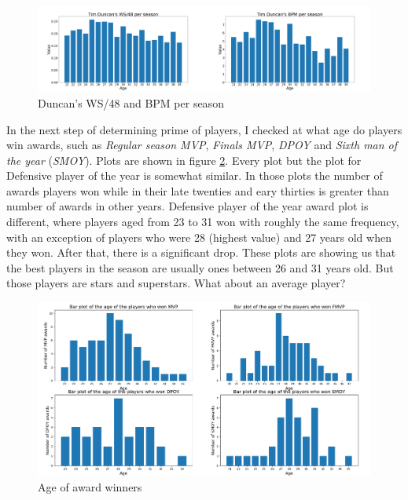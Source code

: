\documentclass[a4paper]{article}
\begin{document}
\begin{figure}[h!]
\begin{center}
\includegraphics[scale=0.30]{duncan.png}
\end{center}
\caption{Duncan's WS/48 and BPM per season}
\label{plt:duncan}
\end{figure}


In the next step of determining prime of players, I checked at what age do players win awards, such as \textit{Regular season MVP}, \textit{Finals MVP}, \textit{DPOY} and \textit{Sixth man of the year} (\textit{SMOY}). Plots are shown in figure \ref{plt:awards}. Every plot but the plot for Defensive player of the year is somewhat similar. In those plots the number of awards players won while in their late twenties and eary thirties is greater than number of awards in other years. Defensive player of the year award plot is different, where players aged from 23 to 31 won with roughly the same frequency, with an exception of players who were 28 (highest value) and 27 years old when they won. After that, there is a significant drop. These plots are showing us that the best players in the season are usually ones between 26 and 31 years old. But those players are stars and superstars. What about an average player?

\begin{figure}[h!]
\begin{center}
\includegraphics[scale=0.3]{awards_plots.png}
\end{center}
\caption{Age of award winners}
\label{plt:awards}
\end{figure}
\end{document}
